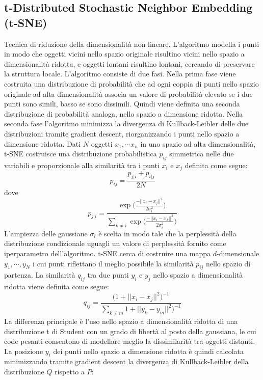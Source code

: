 \documentclass[11pt,a4paper,twocolumn]{article}
\begin{document}
\subsection{t-Distributed Stochastic Neighbor Embedding (t-SNE)}
Tecnica di riduzione della dimensionalità non lineare. L'algoritmo modella i punti in modo che oggetti vicini nello spazio originale risultino vicini nello spazio a dimensionalità ridotta, e oggetti lontani risultino lontani, cercando di preservare la struttura locale. L'algoritmo consiste di due fasi. Nella prima fase viene costruita una distribuzione di probabilità che ad ogni coppia di punti nello spazio originale ad alta dimensionalità associa un valore di probabilità elevato se i due punti sono simili, basso se sono dissimili. Quindi viene definita una seconda distribuzione di probabilità analoga, nello spazio a dimensione ridotta. Nella seconda fase l'algoritmo  minimizza la divergenza di Kullback-Leibler delle due distribuzioni tramite gradient descent, riorganizzando i punti nello spazio a dimensione ridotta. Dati $ N $ oggetti $ x_1,\cdots x_n $ in uno spazio ad alta dimensionalità, t-SNE costruisce una distribuzione probabilistica $ p_{ij} $ simmetrica nelle due variabili e proporzionale alla similarità tra i punti $ x_i $ e $ x_j $ definita come segue:
\begin{equation}
\nonumber
p_{ij}=\frac{p_{j \lvert i}+ p_{i \lvert j}}{2N}
\end{equation}
dove
\begin{equation}
\nonumber
p_{j \lvert i}=\frac{\exp{\biggl(\frac{-\lvert \vert {x_i-x_j}\lvert \lvert^2}{2\sigma_i^2}\biggr)}}{\sum_{k \neq i}{\exp{\biggl(\frac{-\lvert \vert {x_i-x_k}\lvert \lvert^2}{2\sigma_i^2}\biggr)}}}
\end{equation}
L'ampiezza delle gaussiane $ \sigma_i $ è scelta in modo tale che la perplessità della distribuzione condizionale uguagli un valore di perplessità fornito come iperparametro dell'algoritmo. t-SNE cerca di costruire una mappa $ d $-dimensionale $y_1,\cdots, y_N $ i cui punti riflettano il meglio possibile la similarità $p_{ij}$ nello spazio di partenza. La similarità $ q_{ij} $ tra due punti $ y_i $ e $ y_j $ nello spazio a dimensionalità ridotta viene definita come segue:
\begin{equation}
\nonumber
q_{ij}=\frac{\bigl(1+\lvert \vert {x_i-x_j}\lvert \lvert^2\bigr)^{-1}}{\sum_{k \neq m}{1+\lvert \vert {y_k-y_m}\lvert \lvert^2\bigr)^{-1}}}
\end{equation}
La differenza principale è l'uso nello spazio a dimensionalità ridotta di una distribuzione t di Student con un grado di libertà al posto della gaussiana, le cui code pesanti consentono di modellare meglio la dissimilarità tra oggetti distanti. La posizione $ y_i $ dei punti nello spazio a dimensione ridotta è quindi calcolata minimizzando tramite gradient descent la divergenza di Kullback-Leibler della distribuzione $ Q $ rispetto a $ P $:
\end{document}
